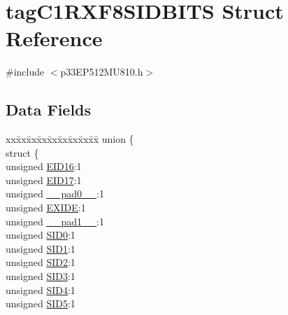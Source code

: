 \hypertarget{structtag_c1_r_x_f8_s_i_d_b_i_t_s}{}\section{tag\+C1\+R\+X\+F8\+S\+I\+D\+B\+I\+TS Struct Reference}
\label{structtag_c1_r_x_f8_s_i_d_b_i_t_s}


{\ttfamily \#include $<$p33\+E\+P512\+M\+U810.\+h$>$}

\subsection*{Data Fields}
\begin{DoxyCompactItemize}
\item 
\begin{tabbing}
xx\=xx\=xx\=xx\=xx\=xx\=xx\=xx\=xx\=\kill
union \{\\
\>struct \{\\
\>\>unsigned \hyperlink{structtag_c1_r_x_f8_s_i_d_b_i_t_s_a6dd5663b0c9838c56db040560ca0efa1}{EID16}:1\\
\>\>unsigned \hyperlink{structtag_c1_r_x_f8_s_i_d_b_i_t_s_aa648615464b0eb29967529333eee9fd9}{EID17}:1\\
\>\>unsigned \hyperlink{structtag_c1_r_x_f8_s_i_d_b_i_t_s_adf71f3d8410c1f1dbbc96680a92c49af}{\_\_pad0\_\_}:1\\
\>\>unsigned \hyperlink{structtag_c1_r_x_f8_s_i_d_b_i_t_s_a09ff1c1be3927220bd3dfbc10edfe243}{EXIDE}:1\\
\>\>unsigned \hyperlink{structtag_c1_r_x_f8_s_i_d_b_i_t_s_acaf2d0924a107ec6e8d2e31febaf66f9}{\_\_pad1\_\_}:1\\
\>\>unsigned \hyperlink{structtag_c1_r_x_f8_s_i_d_b_i_t_s_a1ca276ac15df60e1f7b9a6d0011ade93}{SID0}:1\\
\>\>unsigned \hyperlink{structtag_c1_r_x_f8_s_i_d_b_i_t_s_a3405d354f81391f879648f69f504dfc8}{SID1}:1\\
\>\>unsigned \hyperlink{structtag_c1_r_x_f8_s_i_d_b_i_t_s_ad744966dfc49307f731b7045b01b94e5}{SID2}:1\\
\>\>unsigned \hyperlink{structtag_c1_r_x_f8_s_i_d_b_i_t_s_a9345f3e64720be93e83d8dfc827f3f45}{SID3}:1\\
\>\>unsigned \hyperlink{structtag_c1_r_x_f8_s_i_d_b_i_t_s_aefb106fed4bb40e2c3c71ac612c554e3}{SID4}:1\\
\>\>unsigned \hyperlink{structtag_c1_r_x_f8_s_i_d_b_i_t_s_a0f221b3c9612231686bf87ccdcec8489}{SID5}:1\\

\end{tabbing}
\end{DoxyCompactItemize}
